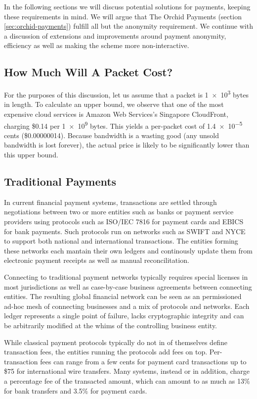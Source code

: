 In the following sections we will discuss potential solutions for payments, keeping these requirements in mind. We will argue that The Orchid Payments (section \ref{sec:orchid-payments}) fulfill all but the anonymity requirement. We continue with a discussion of extensions and improvements around payment anonymity, efficiency as well as making the scheme more non-interactive.

\subsection{How Much Will A Packet Cost?}

For the purposes of this discussion, let us assume that a packet is \num{1e3} bytes in length. To calculate an upper bound, we observe that one of the most expensive cloud services is Amazon Web Services's Singapore CloudFront, charging \$0.14 per \num{1e9} bytes. This yields a per-packet cost of \num{1.4e-5} cents (\$0.00000014). Because bandwidth is a wasting good (any unsold bandwidth is lost forever), the actual price is likely to be significantly lower than this upper bound.

\subsection{Traditional Payments}

In current financial payment systems, transactions are settled through negotiations between two or more entities such as banks or payment service providers\cite{PSP} using protocols such as ISO/IEC 7816\cite{ISO7816} for payment cards and EBICS\cite{EBICS} for bank payments. Such protocols run on networks such as SWIFT\cite{SWIFT} and NYCE\cite{NYCE} to support both national and international transactions. The entities forming these networks each mantain their own ledgers and continously update them from electronic payment receipts as well as manual reconcilitation\cite{Reconcil}.

Connecting to traditional payment networks typically requires special licenses in most jurisdictions as well as case-by-case business agreements between connecting entities. The resulting global financial network can be seen as an permissioned ad-hoc mesh of connecting businesses and a mix of protocols and networks. Each ledger represents a single point of failure, lacks cryptographic integrity and can be arbitrarily modified at the whims of the controlling business entity.

While classical payment protocols typically do not in of themselves define transaction fees, the entities running the protocols add fees on top. Per-transaction fees can range from a few cents for payment card transactions\cite{CardFees1} up to \$75 for international wire transfers\cite{WireTransfers1}. Many systems, instead or in addition, charge a percentage fee of the transacted amount, which can amount to as much as 13\% for bank transfers\cite{WireTransfers2} and 3.5\% for payment cards\cite{CardFees2}.

